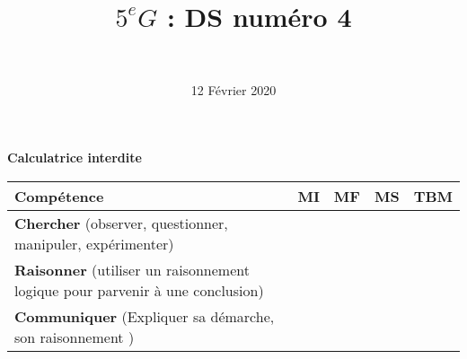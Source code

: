 \documentclass[a4paper,11pt]{exam}
\author{\ }
\date{12 Février 2020}
\title{$5^e G$ : DS num\'ero 4}
\begin{document}
%	

	\maketitle
	
\begin{center}
	\textbf{Calculatrice interdite}
\end{center}

%
\begin{small}
	\begin{center}
		\begin{tabular}{|@{\ }l@{\ }|@{\ }c@{\ }|@{\ }c@{\ }|@{\ }c@{\ }|@{\ }c@{\ }|}
			\hline
			\textbf{Compétence} & \textbf{MI} & \textbf{MF} & \textbf{MS} & \textbf{TBM} \\
			\hline
			\textbf{Chercher} (observer, questionner, manipuler, expérimenter) &  \ \ & \ \ & \ \ & \ \  \\
			\hline	
			\textbf{Raisonner} (utiliser un raisonnement logique pour parvenir à une conclusion) & \ \ & \ \ &  \ \  & \ \ \\
			\hline
			\textbf{Communiquer} (Expliquer sa démarche, son raisonnement ) &  \ \ & \ \ & \ \ & \ \  \\
			\hline
		\end{tabular}
	\end{center}
\end{small}	

	
	
	










\newpage


\label{LastPage}
\end{document}
